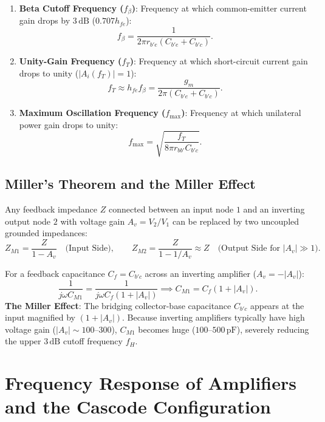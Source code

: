 \documentclass[12pt,a4paper]{article}
\begin{document}
\begin{tcolorbox}[formulabox, title={Cutoff and Unity-Gain Frequencies}]
\begin{enumerate}[leftmargin=1.5em, itemsep=2pt]
  \item \textbf{Beta Cutoff Frequency ($f_\beta$)}: Frequency at which common-emitter current gain drops by $3\,\mathrm{dB}$ ($0.707 h_{fe}$):
  \[
  f_\beta = \frac{1}{2\pi r_{b'e}(C_{b'e} + C_{b'c})}.
  \]
  \item \textbf{Unity-Gain Frequency ($f_T$)}: Frequency at which short-circuit current gain drops to unity ($|A_i(f_T)| = 1$):
  \[
  f_T \approx h_{fe} f_\beta = \frac{g_m}{2\pi (C_{b'e} + C_{b'c})}.
  \]
  \item \textbf{Maximum Oscillation Frequency ($f_{\max}$)}: Frequency at which unilateral power gain drops to unity:
  \[
  f_{\max} = \sqrt{\frac{f_T}{8\pi r_{bb'} C_{b'c}}}.
  \]
\end{enumerate}
\end{tcolorbox}

\subsection{Miller's Theorem and the Miller Effect}
\begin{tcolorbox}[defbox, title={Miller's Theorem}]
Any feedback impedance $Z$ connected between an input node $1$ and an inverting output node $2$ with voltage gain $A_v = V_2/V_1$ can be replaced by two uncoupled grounded impedances:
\[
Z_{M1} = \frac{Z}{1 - A_v}\quad\text{(Input Side)},\qquad
Z_{M2} = \frac{Z}{1 - 1/A_v} \approx Z\quad\text{(Output Side for } |A_v| \gg 1\text{)}.
\]
\end{tcolorbox}

For a feedback capacitance $C_f = C_{b'c}$ across an inverting amplifier ($A_v = -|A_v|$):
\[
\frac{1}{j\omega C_{M1}} = \frac{1}{j\omega C_f(1 + |A_v|)} \implies C_{M1} = C_f(1 + |A_v|).
\]
\textbf{The Miller Effect}: The bridging collector-base capacitance $C_{b'c}$ appears at the input magnified by $(1 + |A_v|)$. Because inverting amplifiers typically have high voltage gain ($|A_v| \sim 100$--$300$), $C_{M1}$ becomes huge ($100$--$500\,\mathrm{pF}$), severely reducing the upper $3\,\mathrm{dB}$ cutoff frequency $f_H$.

\section{Frequency Response of Amplifiers and the Cascode Configuration}
\end{document}
